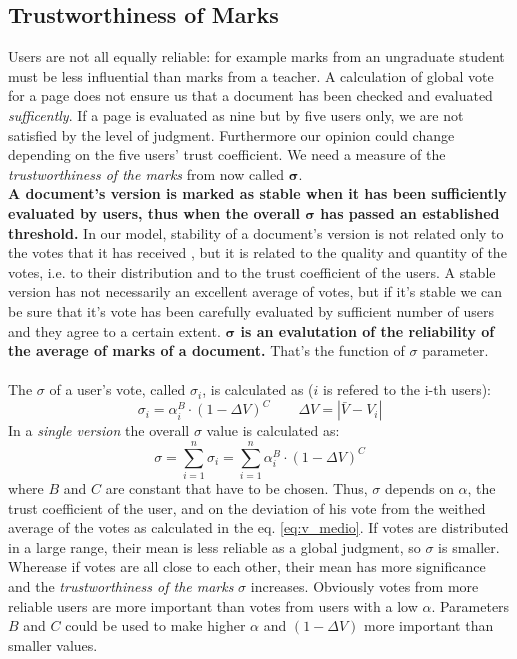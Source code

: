 \documentclass[a4paper,11pt]{article}
\newcommand{\sg}{$\sigma$ }
\newcommand{\al}{$\alpha$ }
\begin{document}
\subsection{Trustworthiness of Marks} \label{sec:sigma}
Users are not all equally reliable: for example marks from an ungraduate student must be 
less influential than marks from a teacher. A calculation of global vote for a page does 
not ensure us that a document has been checked and evaluated \emph{sufficently}. If a page 
is evaluated as nine but by five users only, we are not satisfied by the level of judgment. Furthermore our opinion could change depending on the five users' trust coefficient. We need a measure of the \emph{trustworthiness of the marks} from now called $\boldsymbol{\sigma}$. \\ \textbf{A document's version is marked as stable when it has been sufficiently evaluated by users, thus when the overall $\boldsymbol{\sigma}$ has passed an established threshold.} In our model, stability of a document's version is not related only to the votes that it has received , but it is related to the quality and quantity of the votes, i.e. to their distribution and to the trust coefficient of the users. A stable version has not necessarily an excellent average of votes, but if it's stable we can be sure that it's vote has been carefully evaluated by sufficient number of users and they agree to a certain extent. \textbf{ $\boldsymbol{\sigma}$ is an evalutation of the reliability of the average of marks of a document.} That's the function of \sg parameter.
\\ \\The \sg of a user's vote, called $\sigma_i$, is calculated as ($i$ is refered to the i-th users):
\begin{equation} \label{eq:single_sigma}
\sigma_i = \alpha_i^B \cdot \left(1- \Delta V\right)^C \qquad \Delta V = |\bar{V}- V_i| 
\end{equation}
In a \emph{single version} the overall \sg value is calculated as:
\begin{equation} \label{eq:partial_sigma}
\sigma= \sum_{i=1}^n \sigma_i = \sum_{i=1}^n \alpha_i^B \cdot \left(1- \Delta V\right)^C
\end{equation}
where $B$ and $C$ are constant that have to be chosen.
Thus, \sg depends on $\alpha$, the trust coefficient of the user, and on the deviation of 
his vote from the weithed average of the votes as calculated in the eq. \ref{eq:v_medio}. 
If votes are distributed in a large range, their mean is less reliable as a global 
judgment, so \sg is smaller. Wherease if votes are all close to each other, their mean has 
more significance and the \emph{trustworthiness of the marks} \sg increases. Obviously 
votes from more reliable users are more important than votes from users with a low $\alpha
$. Parameters $B$ and $C$ could be used to make higher \al and $(1-\Delta V)$ more 
important than smaller values.
\end{document}
